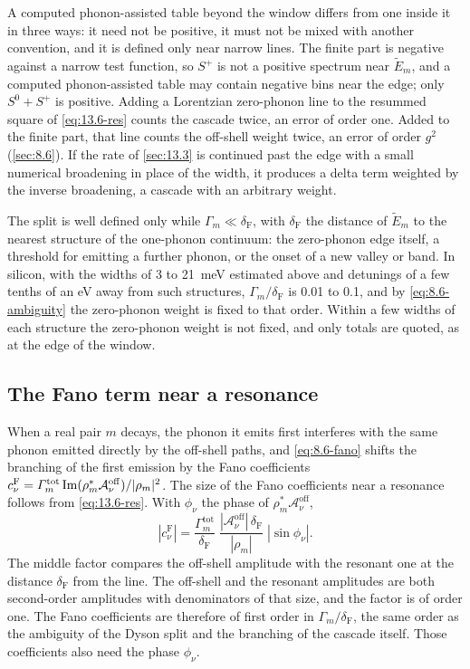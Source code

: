 A computed phonon-assisted table beyond the window differs from one inside it in three ways: it need not be positive, it must not be mixed with another convention, and it is defined only near narrow lines. The finite part is negative against a narrow test function, so $S^+$ is not a positive spectrum near $\tilde E_m$, and a computed phonon-assisted table may contain negative bins near the edge; only $S^0 + S^+$ is positive. Adding a Lorentzian zero-phonon line to the resummed square of \cref{eq:13.6-res} counts the cascade twice, an error of order one. Added to the finite part, that line counts the off-shell weight twice, an error of order $g^2$ (\cref{sec:8.6}). If the rate of \cref{sec:13.3} is continued past the edge with a small numerical broadening in place of the width, it produces a delta term weighted by the inverse broadening, a cascade with an arbitrary weight.

The split is well defined only while $\varGamma_m \ll \delta_{\mathrm{F}}$, with $\delta_{\mathrm{F}}$ the distance of $\tilde E_m$ to the nearest structure of the one-phonon continuum: the zero-phonon edge itself, a threshold for emitting a further phonon, or the onset of a new valley or band. In silicon, with the widths of 3 to \SI{21}{meV} estimated above and detunings of a few tenths of an eV away from such structures, $\varGamma_m/\delta_{\mathrm{F}}$ is 0.01 to 0.1, and by \cref{eq:8.6-ambiguity} the zero-phonon weight is fixed to that order. Within a few widths of each structure the zero-phonon weight is not fixed, and only totals are quoted, as at the edge of the window.

\subsection{The Fano term near a resonance}

When a real pair $m$ decays, the phonon it emits first interferes with the same phonon emitted directly by the off-shell paths, and \cref{eq:8.6-fano} shifts the branching of the first emission by the Fano coefficients $c^{\mathrm{F}}_\nu = \varGamma^{\mathrm{tot}}_m\operatorname{Im}(\rho_m^*\mathcal{A}^{\mathrm{off}}_\nu)/|\rho_m|^2$. The size of the Fano coefficients near a resonance follows from \cref{eq:13.6-res}. With $\phi_\nu$ the phase of $\rho_m^*\mathcal{A}^{\mathrm{off}}_\nu$,
\begin{equation}
  |c^{\mathrm{F}}_\nu| = \frac{\varGamma^{\mathrm{tot}}_m}{\delta_{\mathrm{F}}}\;\frac{|\mathcal{A}^{\mathrm{off}}_\nu|\,\delta_{\mathrm{F}}}{|\rho_m|}\;|\sin\phi_\nu| .
  \label{eq:13.6-fano}
\end{equation}
The middle factor compares the off-shell amplitude with the resonant one at the distance $\delta_{\mathrm{F}}$ from the line. The off-shell and the resonant amplitudes are both second-order amplitudes with denominators of that size, and the factor is of order one. The Fano coefficients are therefore of first order in $\varGamma_m/\delta_{\mathrm{F}}$, the same order as the ambiguity of the Dyson split and the branching of the cascade itself. Those coefficients also need the phase $\phi_\nu$.

